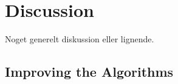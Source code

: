 \chapter{Discussion}

Noget generelt diskussion eller lignende. 



\section{Improving the Algorithms}




